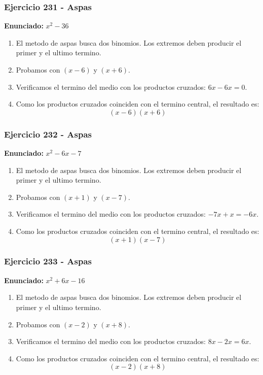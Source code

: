 \documentclass[11pt,a4paper]{article}
\begin{document}
\vspace{0.2cm}
\subsubsection*{Ejercicio 231 - Aspas}
\textbf{Enunciado:} $ x^{2} - 36 $\par
\begin{enumerate}[leftmargin=2em]
\item El metodo de aspas busca dos binomios. Los extremos deben producir el primer y el ultimo termino.
\item Probamos con \((x - 6)\) y \((x + 6)\).
\item Verificamos el termino del medio con los productos cruzados: \(6 x- 6 x=0\).
\item Como los productos cruzados coinciden con el termino central, el resultado es: \[\boxed{\left(x - 6\right)\left(x + 6\right)}\]
\end{enumerate}

\vspace{0.2cm}
\subsubsection*{Ejercicio 232 - Aspas}
\textbf{Enunciado:} $ x^{2} - 6 x - 7 $\par
\begin{enumerate}[leftmargin=2em]
\item El metodo de aspas busca dos binomios. Los extremos deben producir el primer y el ultimo termino.
\item Probamos con \((x + 1)\) y \((x - 7)\).
\item Verificamos el termino del medio con los productos cruzados: \(- 7 x+x=- 6 x\).
\item Como los productos cruzados coinciden con el termino central, el resultado es: \[\boxed{\left(x + 1\right)\left(x - 7\right)}\]
\end{enumerate}

\vspace{0.2cm}
\subsubsection*{Ejercicio 233 - Aspas}
\textbf{Enunciado:} $ x^{2} + 6 x - 16 $\par
\begin{enumerate}[leftmargin=2em]
\item El metodo de aspas busca dos binomios. Los extremos deben producir el primer y el ultimo termino.
\item Probamos con \((x - 2)\) y \((x + 8)\).
\item Verificamos el termino del medio con los productos cruzados: \(8 x- 2 x=6 x\).
\item Como los productos cruzados coinciden con el termino central, el resultado es: \[\boxed{\left(x - 2\right)\left(x + 8\right)}\]
\end{enumerate}
\end{document}
